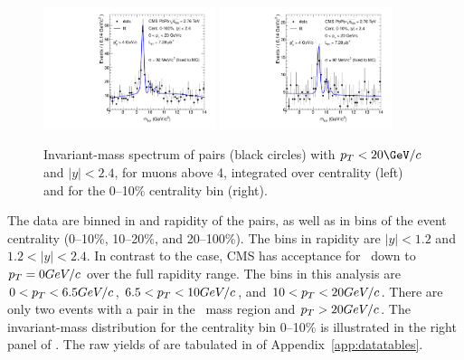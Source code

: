 \begin{figure}[htbp]
  \begin{center}
    \includegraphics[width=0.45\textwidth]{chap_YInPbPbColl2010_figures/masspeak_Hi.pdf}
    \includegraphics[width=0.45\textwidth]{chap_YInPbPbColl2010_figures/masspeak_Hi_cntr0-10.pdf}
    \caption{Invariant-mass spectrum of \mumu pairs (black circles)
      with $\pt<20\GeV/c$ and $|y|<2.4$, for muons above 4\GeVc,
      integrated over centrality (left) and for the 0--10\% centrality
      bin (right).}
    \label{fig:ups_invmass}
  \end{center}
\end{figure}

The data are binned in \pt and rapidity of the \mumu pairs, as well as
in bins of the event centrality (0--10\%, 10--20\%, and
20--100\%). The bins in rapidity are $|y|<1.2$ and $1.2<|y|<2.4$. In
contrast to the \Jpsi case, CMS has acceptance for \PgU\ down to
\mbox{$p_T = 0GeV/c$} over the full rapidity range. The \pt bins in
this analysis are $0<p_T<6.5GeV/c$, $6.5<p_T<10GeV/c$, and
$10<p_T<20GeV/c$. There are only two events with a \mumu pair in the
\PgU\ mass region and $p_T > 20GeV/c$. The invariant-mass distribution
for the centrality bin 0--10\% is illustrated in the right panel of
. The raw yields of \PgUa are tabulated
in  of Appendix~\ref{app:datatables}.

